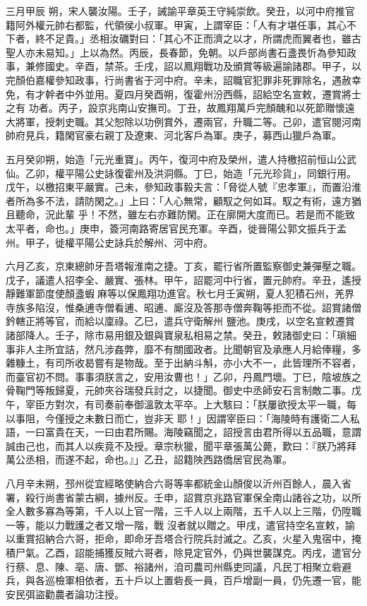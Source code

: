 \begin{pinyinscope}
 三月甲辰
 朔，宋人襲汝陽。壬子，誡諭平章英王守純崇飲。癸丑，以河中府推官籍阿外權元帥右都監，代領侯小叔軍。甲寅，上謂宰臣：「人有才堪任事，其心不下者，終不足貴。」丞相汝礪對曰：「其心不正而濟之以才，所謂虎而翼者也，雖古聖人亦未易知。」上以為然。丙辰，長春節，免朝。以戶部尚書石盞畏忻為參知政事，兼修國史。辛酉，禁茶。壬戌，詔以鳳翔戰功及頒賞等級遍諭諸郡。甲子，以完顏伯嘉權參知政事，行尚書省于河中府。辛未，詔職官犯罪非死罪除名，遇赦幸免，有才幹者中外並用。夏四月癸酉朔，復霍州汾西縣，詔給空名宣敕，遷賞將士之有
 功者。丙子，設京兆南山安撫司。丁丑，故鳳翔萬戶完顏醜和以死節贈懷遠大將軍，授刺史職。其父恕除以功例賞外，遷兩官，升職二等。己卯，遣官閱河南帥府見兵，籍閑官豪右親丁及遼東、河北客戶為軍。庚子，募西山獵戶為軍。



 五月癸卯朔，始造「元光重寶」。丙午，復河中府及榮州，遣人持檄招前恒山公武仙。乙卯，權平陽公史詠復霍州及洪洞縣。丁巳，始造「元光珍貨」，同銀行用。戊午，以檄招東平嚴實。己未，參知政事毅夫言：「脅從人號『忠孝軍』，而置沿淮者所為多不法，請防閑之。」上曰：「人心無常，顧馭之何如耳。馭之有術，遠方猶且聽命，況此輩
 乎！不然，雖左右亦難防閑。正在廓開大度而已。若是而不能致太平者，命也。」庚申，簽河南路寄居官民充軍。辛酉，徙晉陽公郭文振兵于孟州。甲子，徙權平陽公史詠兵於解州、河中府。



 六月乙亥，京東總帥牙吾塔報淮南之捷。丁亥，罷行省所置監察御史兼彈壓之職。戊子，議遣人招李全、嚴實、張林。甲午，詔罷河中行省，置元帥府。辛丑，遙授靜難軍節度使顏盞蝦麻等以保鳳翔功進官。秋七月壬寅朔，夏人犯積石州，羌界寺族多陷沒，惟桑逋寺僧看逋、昭逋、廝沒及答那寺僧奔鞠等拒而不從。詔賞諸僧鈐轄正將等官，而給以廩祿。乙巳，遣兵守衛解州
 鹽池。庚戌，以空名宣敕遷賞諸部降人。壬子，除市易用銀及銀與寶泉私相易之禁。癸丑，敕諸御史曰：「瑣細事非人主所宜詰，然凡涉姦弊，靡不有關國政者。比聞朝官及承應人月給俸糧，多雜糠土，有司所收曷嘗有是物哉。至于出納斗斛，亦小大不一，此皆理所不容者，而臺官初不問。事事須朕言之，安用汝曹也！」乙卯，丹鳳門壞。丁巳，陰坡族之骨鞠門等叛歸夏，元帥夾谷瑞發兵討之，以捷聞。御史中丞師安石言制敵二事。戊午，宰臣方對次，有司奏前奉御溫敦太平卒。上大駭曰：「朕屢欲授太平一職，每以事阻，今僅授之未數日而亡，豈非天
 耶！」因謂宰臣曰：「海陵時有護衛二人私語，一曰富貴在天，一曰由君所賜。海陵竊聞之，詔授言由君所得以五品職，意謂誠由己也，而其人以疾竟不及授。章宗秋獵，聞平章張萬公薨，歎曰：『朕乃將拜萬公丞相，而遂不起，命也。』」乙丑，詔籍陜西路僑居官民為軍。



 八月辛未朔，邳州從宜經略使納合六哥等率都統金山顏俊以沂州百餘人，晨入省署，殺行尚書省蒙古綱，據州反。壬申，詔賞京兆路官軍保全南山諸谷之功，以所全人數多寡為等第，千人以上官一階，三千人以上兩階，五千人以上三階，仍陞職一等，能以力戰護之者又增一階，戰
 沒者就以贈之。甲戌，遣官持空名宣敕，諭以重賞招納合六哥，拒命，即命牙吾塔合行院兵討滅之。乙亥，火星入鬼宿中，掩積尸氣。乙酉，詔能捕獲反賊六哥者，除見定官外，仍與世襲謀克。丙戌，遣官分行蔡、息、陳、亳、唐、鄧、裕諸州，洎司農司州縣吏同議，凡民丁相聚立砦避兵，與各巡檢軍相依者，五十戶以上置砦長一員，百戶增副一員，仍先遷一官，能安民弭盜勸農者論功注授。




\end{pinyinscope}
